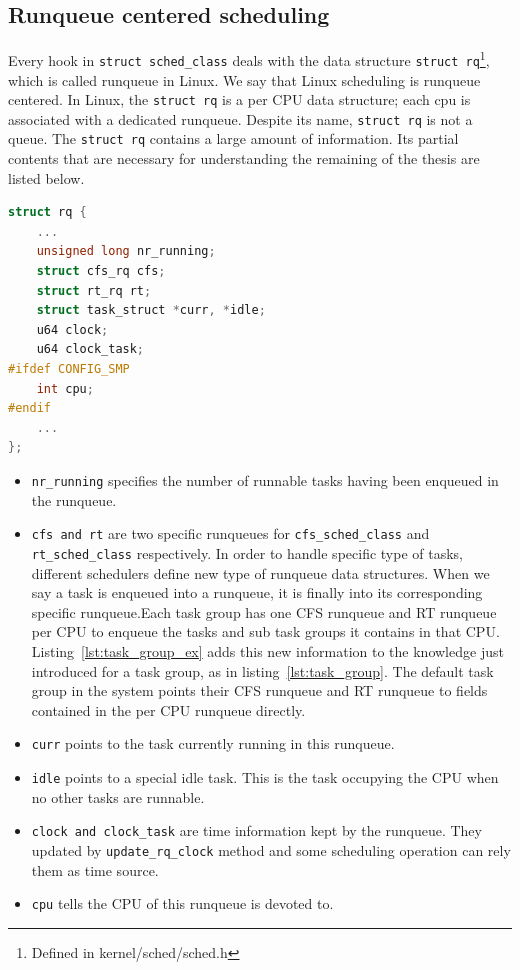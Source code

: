 \subsection{Runqueue centered scheduling\label{LinuxSched_rq}}

Every hook in \texttt{struct sched\_class} deals with the data
structure \texttt{struct rq}\footnote{Defined in kernel/sched/sched.h},
which is called runqueue in Linux.  We say that Linux scheduling is
runqueue centered. In Linux, the \texttt{struct rq} is a per CPU data
structure; each cpu is associated with a dedicated runqueue. Despite 
its name, \texttt{struct rq} is not a queue. The \texttt{struct rq} 
contains a large amount of information. Its partial contents that are 
necessary for understanding the remaining of the thesis are listed below.

\begin{lstlisting}[language=C,
			caption={The runqueue structure},
			label={lst:runqueue}]
struct rq {
	...
	unsigned long nr_running;
	struct cfs_rq cfs;
	struct rt_rq rt;
	struct task_struct *curr, *idle;
	u64 clock;
	u64 clock_task;
#ifdef CONFIG_SMP
	int cpu;
#endif
	...
};
\end{lstlisting}
\begin{itemize}
\item \texttt{nr\_running} specifies the number of runnable tasks 
	having been enqueued in the runqueue.
\item \texttt{cfs and rt} are two specific runqueues for 
	\texttt{cfs\_sched\_class} and \texttt{rt\_sched\_class} respectively. 
	In order to handle specific type of tasks, different schedulers define 
	new type of runqueue data structures. 
	When we say a task is enqueued into a runqueue, it is finally into
	its corresponding specific runqueue.Each task group has one CFS 
	runqueue and RT runqueue per CPU to enqueue the tasks and sub task
	groups it contains in that CPU. 
	Listing~\vref{lst:task_group_ex} adds this new information to the
	knowledge just introduced for a task group, as in 
	listing~\vref{lst:task_group}. The default task group in the system points
	their CFS runqueue and RT runqueue to fields contained in the
	per CPU runqueue directly. 
\item \texttt{curr} points to the task currently running in this runqueue.
\item \texttt{idle} points to a special idle task. This is the task occupying
		the CPU  when no other tasks are runnable.
\item \texttt{clock and clock\_task} are time information kept by the runqueue.
	They updated by \texttt{update\_rq\_clock} method and some scheduling
	operation can rely them as time source.
\item \texttt{cpu} tells the CPU of this runqueue is devoted to.
\end{itemize}
